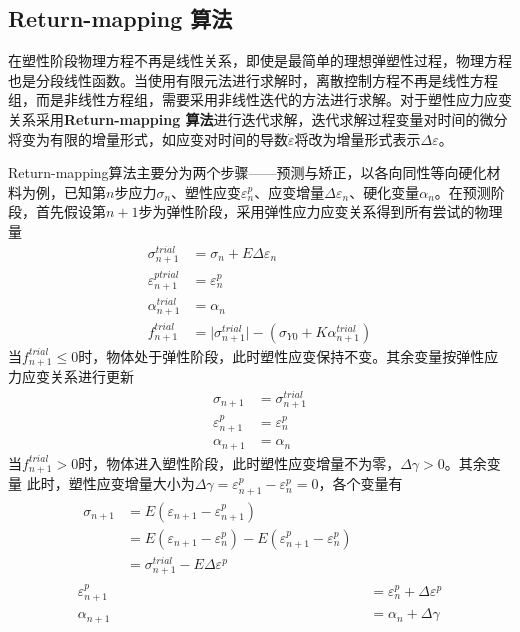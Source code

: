 \subsection{Return-mapping 算法}
在塑性阶段物理方程不再是线性关系，即使是最简单的理想弹塑性过程，物理方程也是分段线性函数。当使用有限元法进行求解时，离散控制方程不再是线性方程组，而是非线性方程组，需要采用非线性迭代的方法进行求解。对于塑性应力应变关系采用\textbf{Return-mapping 算法}进行迭代求解，迭代求解过程变量对时间的微分将变为有限的增量形式，如应变对时间的导数$\dot \varepsilon$将改为增量形式表示$\Delta \varepsilon$。\par
Return-mapping算法主要分为两个步骤——预测与矫正，以各向同性等向硬化材料为例，已知第$n$步应力$\sigma_n$、塑性应变$\varepsilon^p_n$、应变增量$\Delta \varepsilon_n$、硬化变量$\alpha_n$。在预测阶段，首先假设第$n+1$步为弹性阶段，采用弹性应力应变关系得到所有尝试的物理量
\begin{subequations}
\begin{align}
    \sigma_{n+1}^{trial} &= \sigma_n + E \Delta \varepsilon_n \\
    \varepsilon_{n+1}^{ptrial} &= \varepsilon_n^p \\
    \alpha_{n+1}^{trial} &= \alpha_n \\
    f_{n+1}^{trial} &= \vert \sigma_{n+1}^{trial} \vert - (\sigma_{Y0}+K\alpha_{n+1}^{trial})
\end{align}
\end{subequations}
当$f_{n+1}^{trial} \le 0$时，物体处于弹性阶段，此时塑性应变保持不变。其余变量按弹性应力应变关系进行更新
\begin{subequations}
\begin{align}
    \sigma_{n+1} &= \sigma_{n+1}^{trial} \\
    \varepsilon_{n+1}^{p} &= \varepsilon_n^p \\
    \alpha_{n+1} &= \alpha_n
\end{align}
\end{subequations}
当$f_{n+1}^{trial}>0$时，物体进入塑性阶段，此时塑性应变增量不为零，$\Delta \gamma>0$。其余变量
此时，塑性应变增量大小为$\Delta \gamma = \varepsilon_{n+1}^p-\varepsilon_n^p=0$，各个变量有
\begin{subequations}
        \begin{align}
            \begin{split}
            \sigma_{n+1} &= E(\varepsilon_{n+1} - \varepsilon_{n+1}^p) \\
                         &= E(\varepsilon_{n+1} - \varepsilon_n^p) - E(\varepsilon_{n+1}^p - \varepsilon_n^p) \\
                         &= \sigma_{n+1}^{trial} - E \Delta \varepsilon^p
        \end{split} \label{ch_plastic1d:sigman} \\
            \varepsilon_{n+1}^p &= \varepsilon_n^p + \Delta \varepsilon^p \\ 
            \alpha_{n+1} &= \alpha_n + \Delta \gamma
        \end{align}
\end{subequations}
